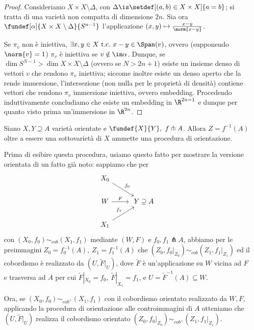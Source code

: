 \begin{proof}
Consideriamo $X \times X \setminus \Delta$, con $\Delta \is \setdef[(a,b) \in X \times X]{a=b}$; si tratta di una varietà non compatta di dimensione $2n$. Sia ora $\fundef[\alpha]{X \times X \setminus \Delta}{S^{n-1}}$ l'applicazione $(x,y) \mapsto \frac{x-y}{\norm{x-y}} $.

Se $\pi_v$ non è iniettiva, $\exists x,y \in X \tc x-y \in \Span(v)$, ovvero (supponendo \wlg $\norm{v} = 1$) $\pi_v$ è iniettiva se $v \notin \im \alpha$. Dunque, se $\dim S^{N-1} > \dim X \times X \setminus \Delta$ (ovvero se $N > 2n+1$) esiste un insieme denso di vettori $v$ che rendono $\pi_v$ iniettiva; siccome inoltre esiste un denso aperto che la rende immersione, l'intersezione (non nulla per le proprietà di densità) contiene vettori che rendono $\pi_v$ immersione iniettiva, ovvero embedding. Procedendo induttivamente concludiamo che esiste un embedding in $\R^{2n-1}$ e dunque per quanto visto prima un'immersione in $\R^{2n}$.
\end{proof}


\begin{prop}
Siano $X, Y \supseteq A$ varietà orientate e $\fundef{X}{Y}, \ f \pitchfork A$.
Allora $Z = f^{-1}(A)$ oltre a essere una sottovarietà di $X$ ammette una procedura di orientazione.
\end{prop}

Prima di esibire questa procedura, usiamo questo fatto per mostrare la versione orientata di un fatto già noto: sappiamo che per \[
\begin{tikzcd}
X_0 \arrow[dr, "f_0"] & \\
W \arrow[r, "F"] & \ Y \supseteq A \\
X_1 \arrow[ur, "f_1"] &
\end{tikzcd} \]
con $(X_0, f_0) \sim_{cob} (X_1, f_1)$ mediante $(W,F)$ e $f_0, f_1 \pitchfork A$, abbiamo per le preimmagini $Z_0 = f_0^{-1}(A), \ Z_1 = f_1^{-1}(A)$ che $(Z_0, f_0 |_{Z_0}) \sim_{cob} (Z_1, f_1 |_{Z_1})$ ed il cobordismo è realizzato da $(U, \tilde{F}|_U)$, dove $\tilde{F}$ è un'applicazione su $W$ vicina ad $F$ e trasversa ad $A$ per cui $\tilde{F}|_{X_0} = f_0, \ \tilde{F}|_{X_1} = f_1$, e $U = \tilde{F}^{-1}(A) \subseteq W$.

Ora, se $(X_0, f_0) \sim_{cob^+} (X_1, f_1)$ con il cobordismo orientato realizzato da $W, F$, applicando la procedura di orientazione alle controimmagini di $A$ otteniamo che $(U, \tilde{F}|_U)$ realizza il cobordismo orientato $(Z_0, f_0 |_{Z_0}) \sim_{cob^+} (Z_1, f_1 |_{Z_1})$.

